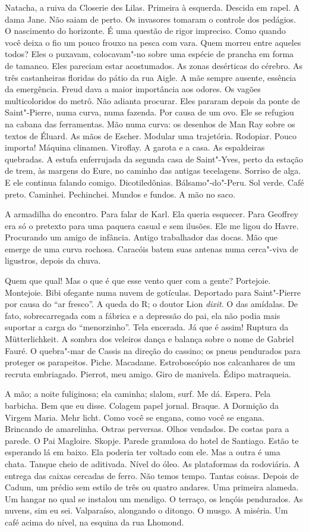Natacha, a ruiva da Closerie des Lilas. Primeira à esquerda. Descida em
rapel. A dama Jane. Não saiam de perto. Os invasores tomaram o controle
dos pedágios. O nascimento do horizonte. É uma questão de rigor
impreciso. Como quando você deixa o fio um pouco frouxo na pesca com
vara. Quem morreu entre aqueles todos? Eles o puxavam, colocavam"-no
sobre uma espécie de prancha em forma de tamanco. Eles pareciam estar
acostumados. As zonas desérticas do cérebro. As três castanheiras
floridas do pátio da rua Aigle. A mãe sempre ausente, essência da
emergência. Freud dava a maior importância aos odores. Os vagões
multicoloridos do metrô. Não adianta procurar. Eles pararam depois da
ponte de Saint"-Pierre, numa curva, numa fazenda. Por causa de um ovo.
Ele se refugiou na cabana das ferramentas. Mão numa curva: os desenhos
de Man Ray sobre os textos de Éluard. As mãos de Escher. Modular uma
trajetória. Rodopiar. Pouco importa! Máquina clinamen. Viroflay. A
garota e a casa. As espaldeiras quebradas. A estufa enferrujada da
segunda casa de Saint"-Yves, perto da estação de trem, às margens do
Eure, no caminho das antigas tecelagens. Sorriso de alga. E ele continua
falando comigo. Dicotiledônias. Bálsamo"-do"-Peru. Sol verde. Café preto.
Caminhei. Pechinchei. Mundos e fundos. A mão no saco.

A armadilha do encontro. Para falar de Karl. Ela queria esquecer. Para
Geoffrey era só o pretexto para uma paquera casual e sem ilusões. Ele me
ligou do Havre. Procurando um amigo de infância. Antigo trabalhador das
docas. Mão que emerge de uma curva rochosa. Caracóis batem suas antenas
numa cerca"-viva de ligustros, depois da chuva.

Quem que qual! Mas o que é que esse vento quer com a gente? Portejoie.
Montejoie. Bibi ofegante numa nuvem de gotículas. Deportado para
Saint"-Pierre por causa do ``ar fresco''. A queda do R; o doutor Lion
\emph{dixit}. O das amídalas. De fato, sobrecarregada com a fábrica e a
depressão do pai, ela não podia mais suportar a carga do ``menorzinho''.
Tela encerada. Já que é assim! Ruptura da Mütterlichkeit. A sombra dos
veleiros dança e balança sobre o nome de Gabriel Fauré. O quebra"-mar de
Cassis na direção do cassino; os pneus pendurados para proteger os
parapeitos. Piche. Macadame. Estroboscópio nos calcanhares de um recruta
embriagado. Pierrot, meu amigo. Giro de manivela. Édipo matraqueia.

A mão; a noite fuliginosa; ela caminha; slalom, surf. Me dá. Espera.
Pela barbicha. Bem que eu disse. Colagem papel jornal. Braque. A
Dormição da Virgem Maria. Mehr licht. Como você se engana, como você se
engana. Brincando de amarelinha. Ostras perversas. Olhos vendados. De
costas para a parede. O Pai Magloire. Skopje. Parede granulosa do hotel
de Santiago. Estão te esperando lá em baixo. Ela poderia ter voltado com
ele. Mas a outra é uma chata. Tanque cheio de aditivada. Nível do óleo.
As plataformas da rodoviária. A entrega das caixas cercadas de ferro.
Não temos tempo. Tantas coisas. Depois de Cadum, um prédio sem estilo de
três ou quatro andares. Uma primeira alameda. Um hangar no qual se
instalou um mendigo. O terraço, os lençóis pendurados. As nuvens, sim eu
sei. Valparaíso, alongando o ditongo. O musgo. A miséria. Um café acima
do nível, na esquina da rua Lhomond.

